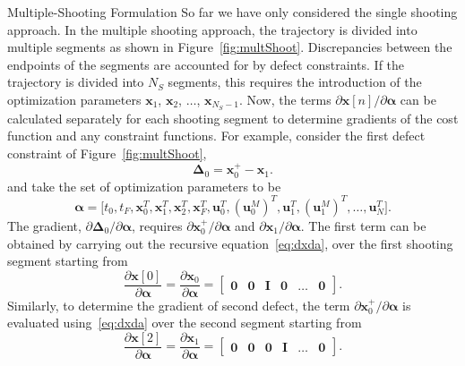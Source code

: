 \documentclass[onecolumn,12pt]{article}
\makeatletter
\newcommand{\bs}{\boldsymbol}
\def\section{\@startsection {section}{1}{\z@}{24pt plus 2pt minus 2pt}
{12pt plus 2pt minus 2pt}{\large\bf\color{RoyalBlue}}}
\makeatother
\begin{document}
\section{Multiple-Shooting Formulation}
So far we have only considered the single shooting approach. In the multiple shooting approach, the trajectory is divided into multiple segments as shown in Figure~\ref{fig:multShoot}. Discrepancies between the endpoints of the segments are accounted for by defect constraints. If the trajectory is divided into $N_S$ segments, this requires the introduction of the optimization parameters $\bs x_1$, $\bs x_2$, $\dots$, $\bs x_{N_S-1}$. Now, the terms $\partial \bs x[n]/\partial \bs \alpha$ can be calculated separately for each shooting segment to determine gradients of the cost function and any constraint functions. For example, consider the first defect constraint of Figure~\ref{fig:multShoot},
\begin{equation*}
\bs\Delta_0 = \bs x_0^{+} - \bs x_1.
\end{equation*}
and take the set of optimization parameters to be 
\begin{equation*}
\bs \alpha = \lbrack t_0, t_F, \bs x_0^T, \bs x_1^T, \bs x_2^T, \bs x_{F}^T, \bs u_0^T, (\bs u^M_0)^T, \bs u_1^T, (\bs u^M_1)^T, \dots , \bs u_N^T \rbrack.
\end{equation*}
The gradient, $\partial \bs\Delta_0/\partial \bs\alpha$, requires $\partial\bs x_0^{+}/\partial \bs \alpha$ and $\partial\bs x_1/\partial \bs \alpha$. The first term can be obtained by carrying out the recursive equation~\eqref{eq:dxda}, over the first shooting segment starting from 
\begin{equation}
\frac{\partial \bs x[0]}{\partial \bs \alpha} = 
\frac{\partial \bs x_0}{\partial \bs \alpha} =
\begin{bmatrix}
\bs 0 & \bs 0 & \bs I & \bs 0 & \dots & \bs 0
\end{bmatrix}.
\end{equation}
Similarly, to determine the gradient of second defect, the term $\partial\bs x_0^{+}/\partial \bs \alpha$ is evaluated using~\eqref{eq:dxda} over the second segment starting from 
\begin{equation}
\frac{\partial \bs x[2]}{\partial \bs \alpha} = 
\frac{\partial \bs x_1}{\partial \bs \alpha} =
\begin{bmatrix}
\bs 0 & \bs 0 & \bs 0 & \bs I & \dots & \bs 0
\end{bmatrix}.
\end{equation}
\end{document}
